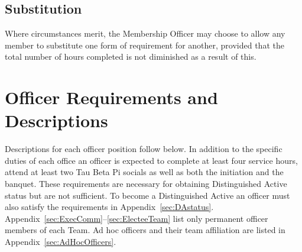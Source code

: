 \section{Substitution} Where circumstances merit, the Membership Officer may choose to allow any member to substitute one form of requirement for another, provided that the total number of hours completed is not diminished as a result of this.

\chapter{Officer Requirements and Descriptions}\label{sec:officerreq}
Descriptions for each officer position follow below. In addition to the specific duties of each office an officer is expected to complete at least four service hours, attend at least two Tau Beta Pi socials as well as both the initiation and the banquet.  These requirements are necessary for obtaining Distinguished Active status but are not sufficient.  To become a Distinguished Active an officer must also satisfy the requirements in Appendix~\ref{sec:DAstatus}. Appendix~\ref{sec:ExecComm}--\ref{sec:ElecteeTeam} list only permanent officer members of each Team. Ad hoc officers and their team affiliation are listed in Appendix~\ref{sec:AdHocOfficers}.

